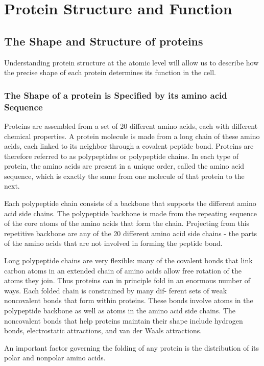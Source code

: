 \chapter{Protein Structure and Function}

\section{The Shape and Structure of proteins}

Understanding protein
structure at the atomic level will allow us to describe how the precise
shape of each protein determines its function in the cell.

\subsection{The Shape of a protein is Specified by its amino acid Sequence}

Proteins are assembled from a set of 20 different amino acids, each with different chemical properties. A protein
molecule is made from a long chain of these amino acids, each linked
to its neighbor through a covalent peptide bond. Proteins
are therefore referred to as polypeptides or polypeptide chains. In each
type of protein, the amino acids are present in a unique order, called the
amino acid sequence, which is exactly the same from one molecule
of that protein to the next.

Each polypeptide chain consists of a backbone that supports the different
amino acid side chains. The polypeptide backbone is made from
the repeating sequence of the core atoms of the amino acids that form
the chain. Projecting from this repetitive backbone are any of the 20 different
amino acid side chains - the parts of the amino acids that are not
involved in forming the peptide bond.

Long polypeptide chains are very flexible: many of the covalent bonds
that link carbon atoms in an extended chain of amino acids allow free
rotation of the atoms they join. Thus proteins can in principle fold in an
enormous number of ways. Each folded chain is constrained by many dif-
ferent sets of weak noncovalent bonds that form within proteins. These
bonds involve atoms in the polypeptide backbone as well as atoms in
the amino acid side chains. The noncovalent bonds that help proteins
maintain their shape include hydrogen bonds, electrostatic attractions,
and van der Waals attractions.

An important factor governing the folding of any protein is the distribution
of its polar and nonpolar amino acids.

